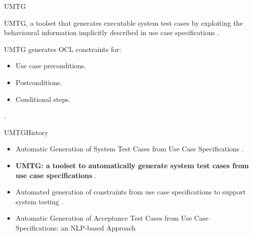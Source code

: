 \documentclass[10pt]{beamer}
\newcommand{\1}{
        	\setbeamertemplate{background}{
        		\texttt{[image: img/1]}
        		\tikz[overlay] \fill[fill opacity=0.75,fill=white] (0,0) rectangle (-\paperwidth,\paperheight);
        	}
}
\begin{document}
\begin{frame}{UMTG}{}	
	\begin{block}{}
		UMTG, a toolset that generates	executable system test cases by exploiting the behavioural	information implicitly described in use case specifications \cite{wang2015umtg}.
	\end{block}	

	\begin{block}{}
		UMTG generates OCL constraints for:
		\begin{itemize}
			\item Use case preconditions.
			\item Postconditions.
			\item Conditional steps.
		\end{itemize}.
	\end{block}	
\end{frame}

\begin{frame}{UMTG}{History}	
	\begin{itemize}
		\item Automatic Generation of System Test Cases from Use Case Specifications \cite{wang2015automatic}.
		
		\item \textbf{UMTG: a toolset to automatically generate system test cases from use case specifications} \cite{wang2015umtg}.
		
		\item Automated generation of constraints from use case specifications to support system testing  \cite{wang2018automated}.
		
		\item Automatic Generation of Acceptance Test Cases from Use Case Specifications: an NLP-based Approach \cite{wang2020automatic}
	\end{itemize}	
	
	
\end{frame}
\end{document}
